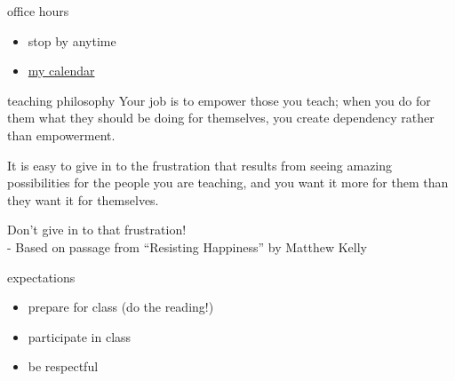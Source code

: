\documentclass[10pt]{beamer}
\begin{document}
  \begin{frame}{office hours}
    \begin{itemize}
      \item stop by anytime
      \item \href{http://exchange.csbsju.edu/owa/calendar/JIVERSON002@CSBSJU.EDU/Calendar/calendar.html}{my calendar}
    \end{itemize}

  \end{frame}

  \begin{frame}{teaching philosophy}
    Your job is to empower those you teach; when you do for them what they
    should be doing for themselves, you create dependency rather than
    empowerment.

    It is easy to give in to the frustration that results from seeing amazing
    possibilities for the people you are teaching, and you want it more for them
    than they want it for themselves. 

    Don’t give in to that frustration! \\
    \hfill \footnotesize{- Based on passage from ``Resisting Happiness'' by Matthew Kelly}

  \end{frame}

  \begin{frame}{expectations}
    \begin{itemize}
      \item prepare for class (do the reading!)
      \item participate in class
      \item be respectful
    \end{itemize}

  \end{frame}
\end{document}
